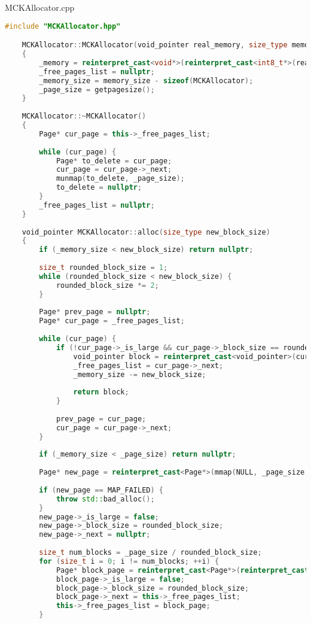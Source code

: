 \documentclass[a4paper, 12pt]{article}
\begin{document}
MCKAllocator.cpp
\begin{lstlisting}[language=C++]
    #include "MCKAllocator.hpp"

    MCKAllocator::MCKAllocator(void_pointer real_memory, size_type memory_size)
    {
        _memory = reinterpret_cast<void*>(reinterpret_cast<int8_t*>(real_memory) + sizeof(MCKAllocator));
        _free_pages_list = nullptr;
        _memory_size = memory_size - sizeof(MCKAllocator);
        _page_size = getpagesize();
    }
    
    MCKAllocator::~MCKAllocator()
    {
        Page* cur_page = this->_free_pages_list;
    
        while (cur_page) {
            Page* to_delete = cur_page;
            cur_page = cur_page->_next;
            munmap(to_delete, _page_size);
            to_delete = nullptr;
        }
        _free_pages_list = nullptr;
    }
    
    void_pointer MCKAllocator::alloc(size_type new_block_size)
    {
        if (_memory_size < new_block_size) return nullptr;
    
        size_t rounded_block_size = 1;
        while (rounded_block_size < new_block_size) {
            rounded_block_size *= 2;
        }
    
        Page* prev_page = nullptr;
        Page* cur_page = _free_pages_list;
    
        while (cur_page) {
            if (!cur_page->_is_large && cur_page->_block_size == rounded_block_size) {
                void_pointer block = reinterpret_cast<void_pointer>(cur_page);
                _free_pages_list = cur_page->_next;
                _memory_size -= new_block_size;
    
                return block;
            }
    
            prev_page = cur_page;
            cur_page = cur_page->_next;
        }
    
        if (_memory_size < _page_size) return nullptr;
    
        Page* new_page = reinterpret_cast<Page*>(mmap(NULL, _page_size, PROT_READ | PROT_WRITE, MAP_PRIVATE | MAP_ANONYMOUS, -1, 0));
                                                    
        if (new_page == MAP_FAILED) {
            throw std::bad_alloc();
        }
        new_page->_is_large = false;
        new_page->_block_size = rounded_block_size;
        new_page->_next = nullptr;
    
        size_t num_blocks = _page_size / rounded_block_size;
        for (size_t i = 0; i != num_blocks; ++i) {
            Page* block_page = reinterpret_cast<Page*>(reinterpret_cast<int8_t*>(new_page) + i * rounded_block_size);
            block_page->_is_large = false;
            block_page->_block_size = rounded_block_size;
            block_page->_next = this->_free_pages_list;
            this->_free_pages_list = block_page;
        }
    

\end{lstlisting}
\end{document}

